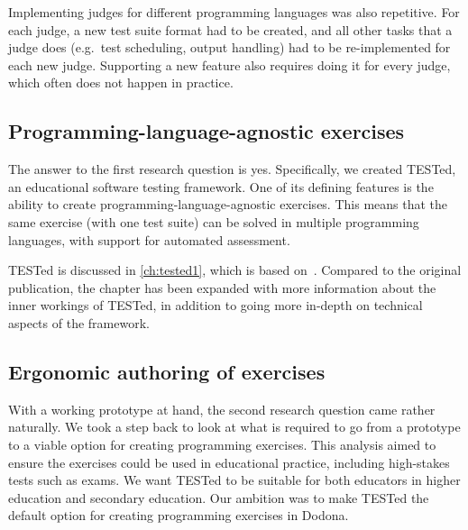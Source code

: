 \documentclass[../main]{subfiles}
\begin{document}
Implementing judges for different programming languages was also repetitive.
For each judge, a new test suite format had to be created, and all other tasks that a judge does (e.g.\ test scheduling, output handling) had to be re-implemented for each new judge.
Supporting a new feature also requires doing it for every judge, which often does not happen in practice.

\subsection{Programming-language-agnostic exercises}\label{subsec:programming-language-agnostic-testing}

The answer to the first research question is yes.
Specifically, we created TESTed, an educational software testing framework.
One of its defining features is the ability to create programming-language-agnostic exercises.
This means that the same exercise (with one test suite) can be solved in multiple programming languages, with support for automated assessment.

TESTed is discussed in \cref{ch:tested1}, which is based on~\autocite{strijbolTESTedEducationalTesting2023}.
Compared to the original publication, the chapter has been expanded with more information about the inner workings of TESTed, in addition to going more in-depth on technical aspects of the framework.

%

\subsection{Ergonomic authoring of exercises}\label{subsec:ergonomic-testing}

With a working prototype at hand, the second research question came rather naturally.
We took a step back to look at what is required to go from a prototype to a viable option for creating programming exercises.
This analysis aimed to ensure the exercises could be used in educational practice, including high-stakes tests such as exams.
We want TESTed to be suitable for both educators in higher education and secondary education.
Our ambition was to make TESTed the default option for creating programming exercises in Dodona.
\end{document}
